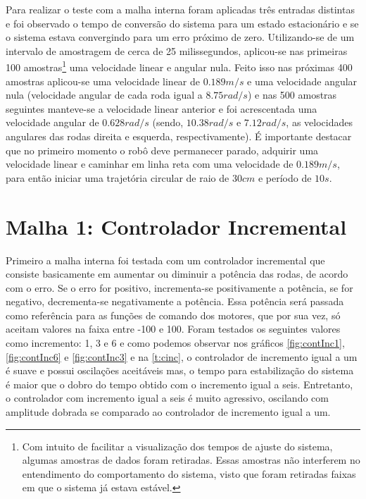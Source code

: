 Para realizar o teste com a malha interna foram aplicadas três entradas distintas e foi observado o tempo de conversão do sistema para um estado estacionário e se o sistema estava convergindo para um erro próximo de zero. Utilizando-se de um intervalo de amostragem de cerca de 25 milissegundos, aplicou-se nas primeiras 100 amostras\footnote{Com intuito de facilitar a visualização dos tempos de ajuste do sistema, algumas amostras de dados foram retiradas. Essas amostras não interferem no entendimento do comportamento do sistema, visto que foram retiradas faixas em que o sistema já estava estável.} uma velocidade linear e angular nula. Feito isso nas próximas 400 amostras aplicou-se uma velocidade linear de $0.189 m/s$ e uma velocidade angular nula (velocidade angular de cada roda igual a $8.75 rad/s$) e nas 500 amostras seguintes manteve-se a velocidade linear anterior e foi acrescentada uma velocidade angular de $0.628 rad/s$ (sendo, $10.38 rad/s$ e $7.12 rad/s$, as velocidades angulares das rodas direita e esquerda, respectivamente). É importante destacar que no primeiro momento o robô deve permanecer parado, adquirir uma velocidade linear e caminhar em linha reta com uma velocidade de $0.189 m/s$, para então iniciar uma trajetória circular de raio de $30 cm$ e período de $10 s$.

\section{Malha 1: Controlador Incremental}
\label{m1ContInc}

Primeiro a malha interna foi testada com um controlador incremental que consiste basicamente em aumentar ou diminuir a potência das rodas, de acordo com o erro. Se o erro for positivo, incrementa-se positivamente a potência, se for negativo, decrementa-se negativamente a potência. Essa potência será passada como referência para as funções de comando dos motores, que por sua vez, só aceitam valores na faixa entre -100 e 100.%
Foram testados os seguintes valores como incremento: 1, 3 e 6 e como podemos observar nos gráficos \ref{fig:contInc1},\ref{fig:contInc6} e \ref{fig:contInc3} e na \autoref{t:cinc}, o controlador de incremento igual a um é suave e possui oscilações aceitáveis mas, o tempo para estabilização do sistema é maior que o dobro do tempo obtido com o incremento igual a seis. Entretanto, o controlador com incremento igual a seis é muito agressivo, oscilando com amplitude dobrada se comparado ao controlador de incremento igual a um. 

